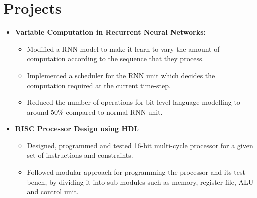 \section{Projects}
\begin{itemize}
    \item \textbf{Variable Computation in Recurrent Neural Networks:}
    {
    \begin{itemize}
    
        \item Modified a RNN model to make it learn to vary the amount of computation according to the sequence that they process.
        
        \item Implemented a scheduler for the RNN unit which decides the computation required at the current time-step.
        
        \item Reduced the number of operations for bit-level language modelling to around 50\% compared to normal RNN unit.
        
    \end{itemize}
    }
    \vspace{5pt}
    
    \item \textbf{RISC Processor Design using HDL}
    {
    \begin{itemize}
    
        \item Designed, programmed and tested 16-bit multi-cycle processor for a given set of instructions and constraints.
        
        \item Followed modular approach for programming the processor and its test bench, by dividing it into sub-modules such as memory, register file, ALU and control unit.
        
    \end{itemize}
    }
\end{itemize}